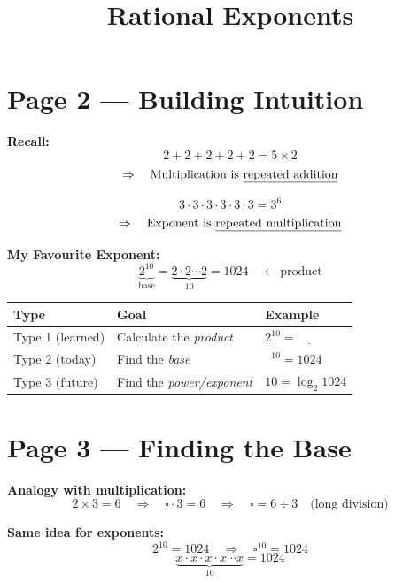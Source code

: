 \documentclass[12pt]{article}
\title{\textbf{Rational Exponents}}
\author{}
\date{}
\begin{document}
\maketitle
\thispagestyle{empty}

\section*{Page 2 — Building Intuition}

\textbf{Recall:}
\[
2 + 2 + 2 + 2 + 2 = 5 \times 2
\]
\[
\Rightarrow \quad \text{Multiplication is \underline{repeated addition}}
\]

\bigskip

\[
3 \cdot 3 \cdot 3 \cdot 3 \cdot 3 \cdot 3 = 3^{6}
\]
\[
\Rightarrow \quad \text{Exponent is \underline{repeated multiplication}}
\]

\bigskip

\textbf{My Favourite Exponent:}
\[
\underbrace{2^{10}}_{\text{base}} = \underbrace{2 \cdot 2 \cdots 2}_{10} = 1024 \quad \leftarrow \text{product}
\]

\bigskip

\begin{center}
\begin{tabular}{lll}
\toprule
\textbf{Type} & \textbf{Goal} & \textbf{Example} \\
\midrule
Type 1 (learned) & Calculate the \textit{product} & $2^{10} = \underline{\quad\quad}$ \\[6pt]
Type 2 (today)   & Find the \textit{base}          & $\boxed{\phantom{0}}^{10} = 1024$ \\[6pt]
Type 3 (future)  & Find the \textit{power/exponent} & $10 = \log_{2} 1024$ \\
\bottomrule
\end{tabular}
\end{center}

\newpage
\section*{Page 3 — Finding the Base}

\textbf{Analogy with multiplication:}
\[
2 \times 3 = 6
\quad \Rightarrow \quad
\square \cdot 3 = 6
\quad \Rightarrow \quad
\square = 6 \div 3 \quad \text{(long division)}
\]

\bigskip

\textbf{Same idea for exponents:}
\[
2^{10} = 1024
\quad \Rightarrow \quad
\square^{10} = 1024
\]
\[
\underbrace{x \cdot x \cdot x \cdot x \cdots x}_{10} = 1024
\]
\end{document}
